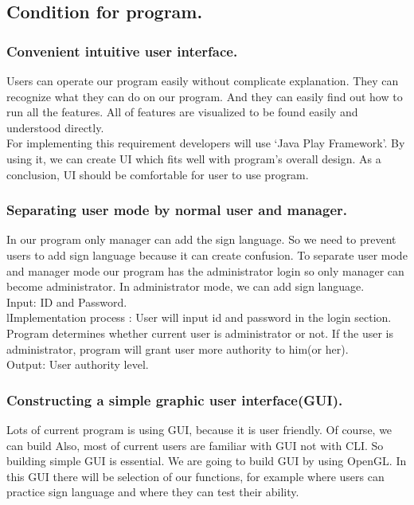\documentclass[10pt,journal,compsoc]{IEEEtran}
\begin{document}
\subsection{Condition for program.\\}

\subsubsection{Convenient intuitive user interface.}

Users can operate our program easily without complicate explanation. They can recognize what they can do on our program. And they can easily find out how to run all the features. All of features are visualized to be found easily and understood directly.
\\For implementing this requirement developers will use ‘Java Play Framework’. By using it, we can create UI which fits well with program's overall design. As a conclusion, UI should be comfortable for user to use program.

\subsubsection{Separating user mode by normal user and manager.}
In our program only manager can add the sign language. So we need to prevent users to add sign language because it can create confusion. To separate user mode and manager mode our program has the administrator login so only manager can become administrator. In administrator mode, we can add sign language.
\\Input:   ID and Password.
\\lImplementation process :  User will input id and password in the login section. Program determines whether current user is administrator or not. If the user is administrator, program will grant user more authority to him(or her).
\\Output:   User authority level.

\subsubsection{ Constructing a simple graphic user interface(GUI).}
Lots of current program is using GUI, because it is user friendly. Of course, we can build Also, most of current users are familiar with GUI not with CLI.  So building simple GUI is essential. We are going to build GUI by using OpenGL. In this GUI there will be selection of our functions, for example where users can practice sign language and where they can test their ability.
\end{document}
